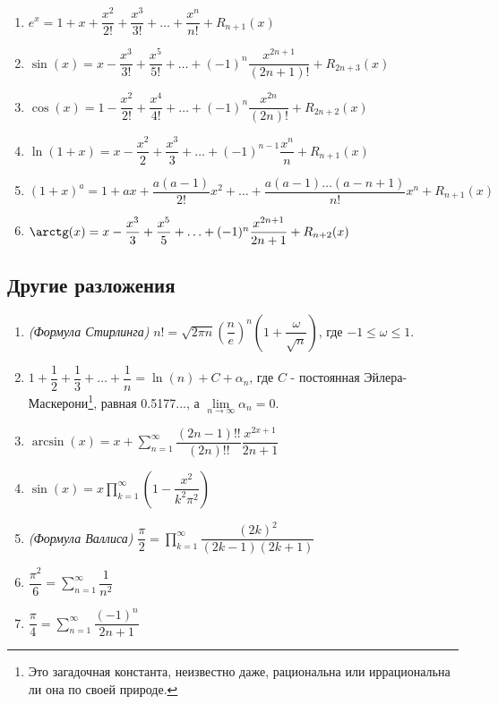 \documentclass[a4paper,12pt]{scrartcl}
\begin{document}
\begin{enumerate}
\item $e^x = 1 + x +\dfrac{x^2}{2!} + \dfrac{x^3}{3!} + \ldots + \dfrac{x^n}{n!} + R_{n+1}(x)$
\item $\sin(x) = x - \dfrac{x^3}{3!} + \dfrac{x^5}{5!} +\ldots + (-1)^n\dfrac{x^{2n+1}}{(2n+1)!} + R_{2n +3}(x)$
\item $\cos(x) = 1 - \dfrac{x^2}{2!} + \dfrac{x^4}{4!} +\ldots + (-1)^n\dfrac{x^{2n}}{(2n)!} + R_{2n +2}(x)$
\item $\ln(1+x) = x - \dfrac{x^2}{2} + \dfrac{x^3}{3}+\ldots + (-1)^{n-1}\dfrac{x^n}{n} + R_{n+1}(x)$
\item $(1+x)^a = 1+ax +\dfrac{a(a-1)}{2!}x^2 + \ldots + \dfrac{a(a-1)\ldots(a-n+1)}{n!}x^n +R_{n+1}(x)$
\item $ \arctg(x) = x - \dfrac{x^3}{3} + \dfrac{x^5}{5}+\ldots + (-1)^{n}\dfrac{x^{2n+1}}{2n+1} + R_{n+2}(x) $
\end{enumerate}
\subsection{Другие разложения}
\begin{enumerate}
\item \emph{(Формула Стирлинга)} $n! = \sqrt{2\pi n}\left(\dfrac{n}{e}\right)^n\left(1 +\dfrac{\omega}{\sqrt{n}}\right)$, где $ -1 \leqslant \omega \leqslant 1$. 
\item $1 + \dfrac{1}{2} + \dfrac{1}{3} + \ldots + \dfrac{1}{n} = \ln(n) + C + \alpha_n$, где $C$ - постоянная Эйлера-Маскерони\footnote{Это загадочная константа, неизвестно даже, рациональна или иррациональна ли она по своей природе.}, равная 0.5177..., а $\lim\limits_{n\to\infty}\alpha_n = 0 $.
\item $ \arcsin(x) = x +\sum\limits_{n=1}^{\infty}\dfrac{(2n-1)!!}{(2n)!!}\dfrac{x^{2x+1}}{2n+1}$
\item $\sin(x) = x\prod\limits_{k=1}^{\infty}\left(1 - \dfrac{x^2}{k^2\pi^2}\right)$
\item \emph{(Формула Валлиса)} $\dfrac{\pi}{2} = \prod\limits_{k=1}^{\infty}\dfrac{(2k)^2}{(2k-1)(2k+1)}$
\item $\dfrac{\pi^2}{6} = \sum\limits_{n=1}^{\infty}\dfrac{1}{n^2}$
\item $\dfrac{\pi}{4} = \sum\limits_{n=1}^{\infty}\dfrac{(-1)^n}{2n+1}$
\end{enumerate}
\end{document}
